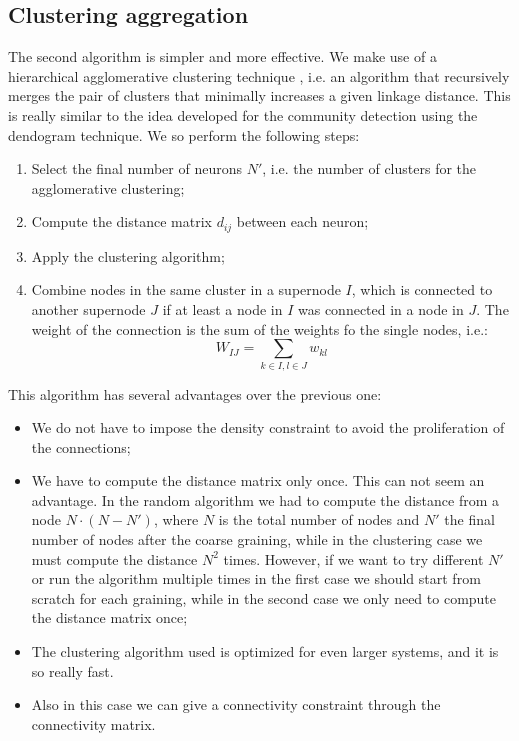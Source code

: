 \subsection{Clustering aggregation \label{subsec:clust}}
The second algorithm is simpler and more effective. We make use of a hierarchical agglomerative
clustering technique \cite{scikit-learn}, i.e. an algorithm that recursively merges the pair of clusters that 
minimally increases a given linkage distance. This is really similar to the idea developed 
for the community detection using the dendogram technique.
We so perform the following steps:
\begin{enumerate}
    \item Select the  final number of neurons $N'$, i.e. the number of clusters for the agglomerative
        clustering;
    \item Compute the distance matrix $d_{ij}$ between each neuron;
    \item Apply the clustering algorithm;
    \item Combine nodes in the same cluster in a supernode $I$, which is connected to another 
        supernode $J$ if at least a node in $I$ was connected in a node in $J$. The weight of the 
        connection is the sum of the weights fo the single nodes, i.e.:
        $$
        W_{IJ} = \sum_{k\in I, l\in J} w_{kl}
        $$
\end{enumerate}
This algorithm has several advantages over the previous one:
\begin{itemize}
    \item We do not have to impose the density constraint to avoid the proliferation of the 
        connections;
    \item We have to compute the distance matrix only once. This can not seem an advantage.
        In the random algorithm we had to compute the distance from a node $N\cdot (N-N')$,
        where $N$ is the total number of nodes and $N'$ the final number of nodes after the 
        coarse graining, while in the clustering case we must compute the distance $N^2$ times.
        However, if we want to try different $N'$ or run the algorithm multiple times in the 
        first case we should start from scratch for each graining, while in the second case
        we only need to compute the distance matrix once;
    \item The clustering algorithm used is optimized for even larger systems, and it is so really
        fast.
    \item Also in this case we can give a connectivity constraint through the connectivity
     matrix.
\end{itemize}


